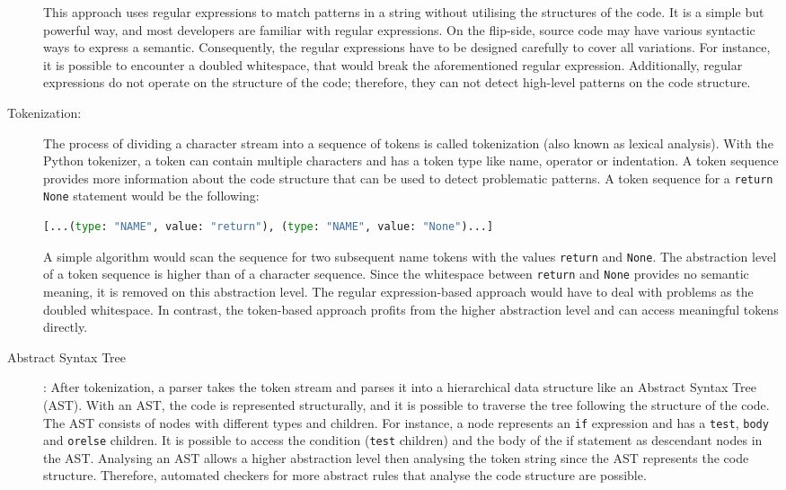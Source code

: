 \begin{description}
    This approach uses regular expressions to match patterns in a string without utilising the structures of the code. It is a simple but powerful way, and most developers are familiar with regular expressions. On the flip-side, source code may have various syntactic ways to express a semantic. Consequently, the regular expressions have to be designed carefully to cover all variations. For instance, it is possible to encounter a doubled whitespace, that would break the aforementioned regular expression. Additionally, regular expressions do not operate on the structure of the code; therefore, they can not detect high-level patterns on the code structure.
    \item[Tokenization:] The process of dividing a character stream into a sequence of tokens is called tokenization (also known as lexical analysis). With the Python tokenizer, a token can contain multiple characters and has a token type like name, operator or indentation. A token sequence provides more information about the code structure that can be used to detect problematic patterns. 
    A token sequence for a \texttt{return None} statement would be the following: 
    \begin{lstlisting}[language=Python]
[...(type: "NAME", value: "return"), (type: "NAME", value: "None")...]\end{lstlisting}
    A simple algorithm would scan the sequence for two subsequent name tokens with the values \texttt{return} and \texttt{None}. The abstraction level of a token sequence is higher than of a character sequence. Since the whitespace between \texttt{return} and \texttt{None} provides no semantic meaning, it is removed on this abstraction level. The regular expression-based approach would have to deal with problems as the doubled whitespace. In contrast, the token-based approach profits from the higher abstraction level and can access meaningful tokens directly.
    \item[Abstract Syntax Tree]: After tokenization, a parser takes the token stream and parses it into a hierarchical data structure like an Abstract Syntax Tree (AST). With an AST, the code is represented structurally, and it is possible to traverse the tree following the structure of the code. The AST consists of nodes with different types and children. For instance, a node represents an \texttt{if} expression and has a \texttt{test}, \texttt{body} and \texttt{orelse} children. It is possible to access the condition (\texttt{test} children) and the body of the if statement as descendant nodes in the AST. Analysing an AST allows a higher abstraction level then analysing the token string since the AST represents the code structure. Therefore, automated checkers for more abstract rules that analyse the code structure are possible.


\end{description}
